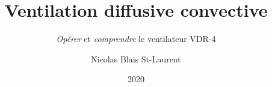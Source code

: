 \documentclass[letterpaper, final]{memoir}
\title{Ventilation diffusive convective}
\author{Nicolas Blais St-Laurent}
\subtitle{\emph{Opérer} et \emph{comprendre} le ventilateur VDR-4}
\date{2020}
\begin{document}
\frontmatter
\makeNtitle

\mainmatter






\end{document}
